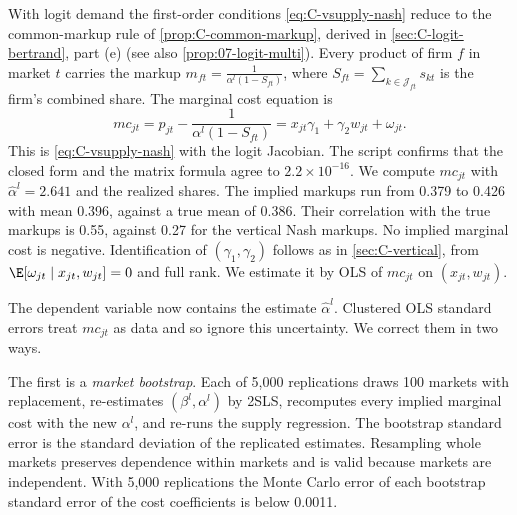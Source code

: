 With logit demand the first-order conditions \eqref{eq:C-vsupply-nash} reduce to the common-markup rule of
\cref{prop:C-common-markup}, derived in \cref{sec:C-logit-bertrand}, part (e) (see also \cref{prop:07-logit-multi}).
Every product of firm $f$ in market $t$ carries the markup $m_{ft} = \frac{1}{\alpha^l(1 - S_{ft})}$, where
$S_{ft} = \sum_{k \in \mathcal{J}_{ft}}s_{kt}$ is the firm's combined share. The marginal cost equation is
\begin{equation}\label{eq:C-lsupply}
  mc_{jt} = p_{jt} - \frac{1}{\alpha^l(1 - S_{ft})} = x_{jt}\gamma_1 + \gamma_2 w_{jt} + \omega_{jt} .
\end{equation}
This is \eqref{eq:C-vsupply-nash} with the logit Jacobian. The script confirms that the closed form and the matrix formula
agree to $2.2\times10^{-16}$. We compute $mc_{jt}$ with $\hat\alpha^l = 2.641$ and the realized shares. The implied
markups run from 0.379 to 0.426 with mean 0.396, against a true mean of 0.386. Their correlation with the true markups
is 0.55, against 0.27 for the vertical Nash markups. No implied marginal cost is negative. Identification of
$(\gamma_1, \gamma_2)$ follows as in \cref{sec:C-vertical}, from $\E[\omega_{jt} \mid x_{jt}, w_{jt}] = 0$ and full rank.
We estimate it by OLS of $mc_{jt}$ on $(x_{jt}, w_{jt})$.

The dependent variable now contains the estimate $\hat\alpha^l$. Clustered OLS standard errors treat $mc_{jt}$ as data
and so ignore this uncertainty. We correct them in two ways.

The first is a \emph{market bootstrap}. Each of 5,000 replications draws 100 markets with replacement, re-estimates
$(\beta^l, \alpha^l)$ by 2SLS, recomputes every implied marginal cost with the new $\alpha^l$, and re-runs the supply
regression. The bootstrap standard error is the standard deviation of the replicated estimates. Resampling whole markets
preserves dependence within markets and is valid because markets are independent. With 5,000 replications the Monte
Carlo error of each bootstrap standard error of the cost coefficients is below 0.0011.

